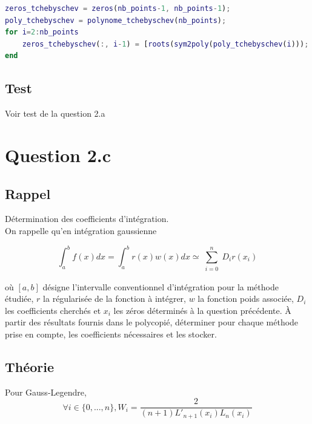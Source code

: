 \documentclass[a4paper,10pt]{report}
\begin{document}
\begin{lstlisting}[caption=Zeros de Tchebyschev, language=Matlab]
zeros_tchebyschev = zeros(nb_points-1, nb_points-1);
poly_tchebyschev = polynome_tchebyschev(nb_points);
for i=2:nb_points
    zeros_tchebyschev(:, i-1) = [roots(sym2poly(poly_tchebyschev(i))); zeros(nb_points-i, 1)];
end
\end{lstlisting}

\subsection*{Test}

Voir test de la question 2.a

\section*{Question 2.c}

\subsection*{Rappel}

Détermination des coefficients d’intégration.\\
On rappelle qu'en intégration gaussienne

\begin{equation*}
\int_{a}^{b}f(x)dx = \int_{a}^{b}r(x) w(x)dx \simeq \sum_{\substack{i=0}}^{n}D_i r(x_i)
\end{equation*}

où $[a, b]$ désigne l’intervalle conventionnel d’intégration pour la méthode étudiée, $r$ la régularisée de la fonction à intégrer, $w$ la fonction poids associée, $D_i$ les coefficients cherchés et $x_i$ les zéros déterminés à la question précédente.
À partir des résultats fournis dans le polycopié, déterminer pour chaque méthode prise en compte, les coefficients nécessaires et les stocker.

\subsection*{Théorie}
Pour Gauss-Legendre, 
\begin{equation*}
\forall{i} \in \{0, ..., n\}, W_i = \frac{2}{(n+1)L'_{n+1}(x_i)L_{n}(x_i)}
\end{equation*}
\end{document}

